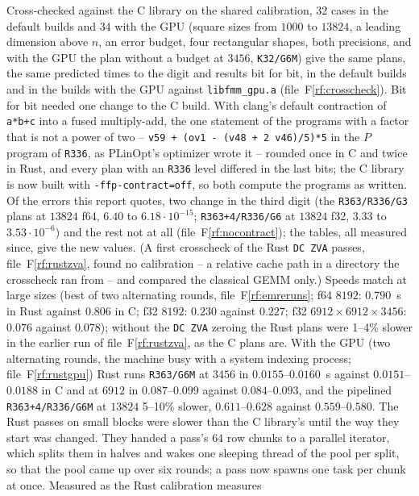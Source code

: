 \documentclass[11pt]{article}
\newcommand{\rf}[1]{F\ref{rf:#1}}
\newcommand{\lv}[1]{\texttt{#1}}
\begin{document}
Cross-checked against the C library on the shared calibration, $32$ cases in
the default builds and $34$ with the GPU (square sizes from $1000$ to $13824$, a leading dimension above
$n$, an error budget, four rectangular shapes, both precisions, and with the
GPU the plan without a budget at $3456$, \lv{K32/G6M}) give the same plans,
the same predicted times to the digit and results bit for bit, in the default
builds and in the builds with the GPU against \texttt{libfmm\_gpu.a}
(file~\rf{crosscheck}).  Bit for bit needed one change to
the C build.  With clang's default contraction of \texttt{a*b+c} into a fused
multiply-add, the one statement of the programs with a factor that is not a
power of two -- \texttt{v59 + (ov1 - (v48 + 2 v46)/5)*5} in the $P$ program of
\lv{R336}, as PLinOpt's optimizer wrote it -- rounded once in C and twice in
Rust, and every plan with an \lv{R336} level differed in the last bits; the C
library is now built with \texttt{-ffp-contract=off}, so both compute the
programs as written.  Of the errors this report quotes, two change in the
third digit (the \lv{R363/R336/G3} plans at $13824$ f64, $6.40$ to
$6.18\cdot10^{-15}$; \lv{R363+4/R336/G6} at $13824$ f32, $3.33$ to
$3.53\cdot10^{-6}$) and the rest not at all
(file~\rf{nocontract}); the tables, all measured since, give the new
values.  (A first crosscheck of the Rust \texttt{DC~ZVA} passes,
file~\rf{rustzva}, found no calibration -- a relative
cache path in a directory the crosscheck ran from -- and compared the classical
GEMM only.)  Speeds match at large sizes
(best of two alternating rounds, file~\rf{emreruns}; f64 $8192$: $0.790$~s in Rust against
$0.806$ in C; f32 $8192$: $0.230$ against $0.227$; f32
$6912\times6912\times3456$: $0.076$ against $0.078$); without the
\texttt{DC~ZVA} zeroing the Rust plans were 1--4\% slower in the earlier run of file~\rf{rustzva}, as
the C plans are.  With the GPU (two alternating rounds, the machine busy with a
system indexing process; file~\rf{rustgpu}) Rust runs
\lv{R363/G6M} at $3456$ in $0.0155$--$0.0160$~s against $0.0151$--$0.0188$ in
C and at $6912$ in $0.087$--$0.099$ against $0.084$--$0.093$, and the
pipelined \lv{R363+4/R336/G6M} at $13824$ 5--10\% slower, $0.611$--$0.628$
against $0.559$--$0.580$.  The Rust passes on small blocks were slower than the C library's until the
way they start was changed.  They handed a pass's $64$ row chunks to a
parallel iterator, which splits them in halves and wakes one sleeping thread
of the pool per split, so that the pool came up over six rounds; a pass now
spawns one task per chunk at once.  Measured as the Rust calibration measures
\end{document}
